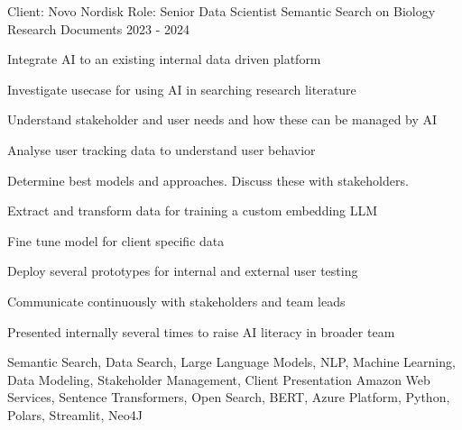 


\begin{cventries}


\cventry
{Client: Novo Nordisk \newline Role: Senior Data Scientist} %
{Semantic Search on Biology Research Documents} %
{}%
{2023 - 2024} %
{ %
\begin{cvitems}
\item {Integrate AI to an existing internal data driven platform}
\item {Investigate usecase for using AI in searching research literature}
\item {Understand stakeholder and user needs and how these can be managed by AI}
\item {Analyse user tracking data to understand user behavior}
\item {Determine best models and approaches. Discuss these with stakeholders.}
\item {Extract and transform data for training a custom embedding LLM}
\item {Fine tune model for client specific data}
\item {Deploy several prototypes for internal and external user testing}
\item {Communicate continuously with stakeholders and team leads}
\item {Presented internally several times to raise AI literacy in broader team}
\end{cvitems}
\cventrykeywords
{Semantic Search, Data Search, Large Language Models, NLP, Machine Learning, Data Modeling, Stakeholder Management, Client Presentation}
{Amazon Web Services, Sentence Transformers, Open Search, BERT, Azure Platform, Python, Polars, Streamlit, Neo4J}
}


\end{cventries}
